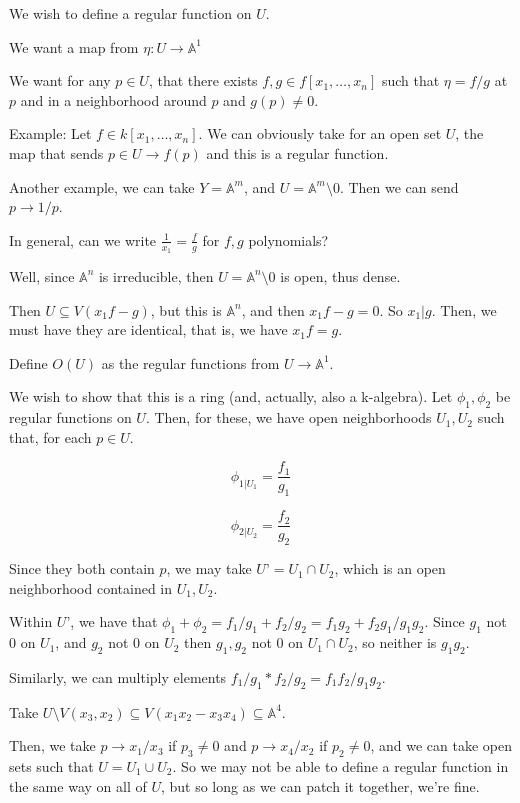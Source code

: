 \documentclass[10pt]{article}
\begin{document}
We wish to define a regular function on $U$.

We want a map from $\eta: U \to \mathbb{A}^1$

We want for any $p \in U$, that there exists $f,g \in f[x_1,…,x_n]$ such that $\eta = f/g$ at $p$ and in a neighborhood around $p$ and $g(p) \not = 0$.

Example: Let $f \in k[x_1,…,x_n]$. We can obviously take for an open set $U$, the map that sends $p \in U \to f(p)$ and this is a regular function.

Another example, we can take $Y = \mathbb{A}^m$, and $U = \mathbb{A}^m \setminus {0}$. Then we can send $p \to 1/p$.

In general, can we write $ \frac{1}{x_1} = \frac{f}{g}$ for $f,g$ polynomials?

Well, since $\mathbb{A}^n$ is irreducible, then $U = \mathbb{A}^n \setminus {0}$ is open, thus dense.

Then $U \subseteq V(x_1 f-g)$, but this is $\mathbb{A}^n$, and then $x_1 f-g = 0$. So $x_1 | g$. Then, we must have they are identical, that is, we have $x_1 f = g$.

Define $O(U)$ as the regular functions from $U \to \mathbb{A}^1$.

We wish to show that this is a ring (and, actually, also a k-algebra). Let $\phi_1, \phi_2$ be regular functions on $U$. Then, for these, we have open neighborhoods $U_1, U_2$ such that, for each $p \in U$.

$$ \phi_{1|{U_1}}= \frac{f_1}{g_1} $$

$$ \phi_{2|{U_2}} = \frac{f_2}{g_2} $$

Since they both contain $p$, we may take $U’ = U_1 \cap U_2$, which is an open neighborhood contained in $U_1,U_2$. 

Within $U’$, we have that $\phi_1 + \phi_2 = f_1/g_1 + f_2/g_2 = f_1g_2 + f_2g_1/g_1g_2$. Since $g_1$ not 0 on $U_1$, and $g_2$ not 0 on $U_2$ then $g_1,g_2$ not 0 on $U_1 \cap U_2$, so neither is $g_1g_2$.

Similarly, we can multiply elements $f_1/g_1 * f_2/g_2 = f_1f_2/g_1g_2$.

Take $U \setminus V(x_3,x_2) \subseteq V(x_1x_2 - x_3x_4) \subseteq \mathbb{A}^4$.

Then, we take $p \to x_1/x_3$ if $p_3 \not = 0$ and $p \to x_4/x_2$ if $p_2 \not = 0$, and we can take open sets such that $U = U_1 \cup U_2$. So we may not be able to define a regular function in the same way on all of $U$, but so long as we can patch it together, we’re fine.
\end{document}
